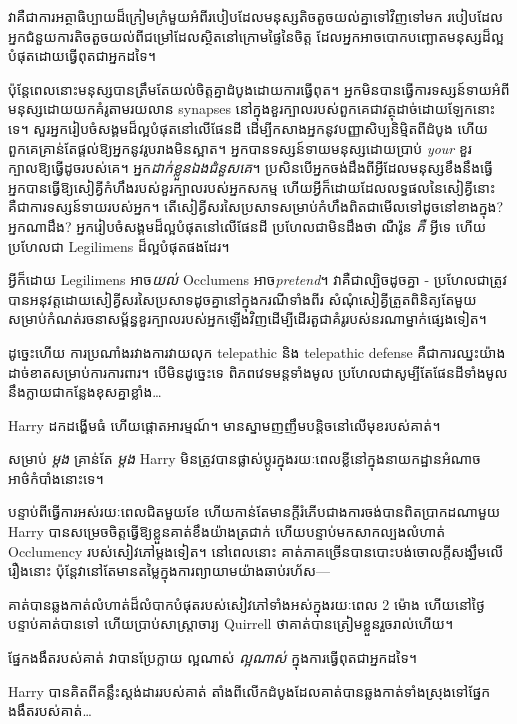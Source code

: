 {វាគឺជាការអត្ថាធិប្បាយដ៏ក្រៀមក្រំមួយអំពីរបៀបដែលមនុស្សតិចតួចយល់គ្នាទៅវិញទៅមក របៀបដែលអ្នកជំនួយការតិចតួចយល់ពីជម្រៅដែលស្ថិតនៅក្រោមផ្ទៃនៃចិត្ត ដែលអ្នកអាចបោកបញ្ឆោតមនុស្សដ៏ល្អបំផុតដោយធ្វើពុតជាអ្នកដទៃ។

ប៉ុន្តែ​ពេល​នោះ​មនុស្ស​បាន​ត្រឹម​តែ​យល់​ចិត្ត​គ្នា​ដំបូង​ដោយ​ការ​ធ្វើ​ពុត។ អ្នកមិនបានធ្វើការទស្សន៍ទាយអំពីមនុស្សដោយយកគំរូតាមរយលាន synapses នៅក្នុងខួរក្បាលរបស់ពួកគេជាវត្ថុដាច់ដោយឡែកនោះទេ។ សួរអ្នករៀបចំសង្គមដ៏ល្អបំផុតនៅលើផែនដី ដើម្បីកសាងអ្នកនូវបញ្ញាសិប្បនិម្មិតពីដំបូង ហើយពួកគេគ្រាន់តែផ្តល់ឱ្យអ្នកនូវរូបរាងមិនស្អាត។ អ្នកបានទស្សន៍ទាយមនុស្សដោយប្រាប់ \emph{your} ខួរក្បាលឱ្យធ្វើដូចរបស់គេ។ អ្នក\emph{ដាក់ខ្លួនឯងជំនួសគេ}។ ប្រសិនបើអ្នកចង់ដឹងពីអ្វីដែលមនុស្សខឹងនឹងធ្វើ អ្នកបានធ្វើឱ្យសៀគ្វីកំហឹងរបស់ខួរក្បាលរបស់អ្នកសកម្ម ហើយអ្វីក៏ដោយដែលលទ្ធផលនៃសៀគ្វីនោះគឺជាការទស្សន៍ទាយរបស់អ្នក។ តើសៀគ្វីសរសៃប្រសាទសម្រាប់កំហឹងពិតជាមើលទៅដូចនៅខាងក្នុង? អ្នកណាដឹង? អ្នករៀបចំសង្គមដ៏ល្អបំផុតនៅលើផែនដី ប្រហែលជាមិនដឹងថា ណឺរ៉ូន \emph{គឺ} អ្វីទេ ហើយប្រហែលជា Legilimens ដ៏ល្អបំផុតផងដែរ។

អ្វីក៏ដោយ Legilimens អាច\emph{យល់} Occlumens អាច\emph{pretend}។ វាគឺជាល្បិចដូចគ្នា - ប្រហែលជាត្រូវបានអនុវត្តដោយសៀគ្វីសរសៃប្រសាទដូចគ្នានៅក្នុងករណីទាំងពីរ សំណុំសៀគ្វីត្រួតពិនិត្យតែមួយសម្រាប់កំណត់រចនាសម្ព័ន្ធខួរក្បាលរបស់អ្នកឡើងវិញដើម្បីដើរតួជាគំរូរបស់នរណាម្នាក់ផ្សេងទៀត។

ដូច្នេះហើយ ការប្រណាំងរវាងការវាយលុក telepathic និង telepathic defense គឺជាការឈ្នះយ៉ាងដាច់ខាតសម្រាប់ការការពារ។ បើមិនដូច្នេះទេ ពិភពវេទមន្តទាំងមូល ប្រហែលជាសូម្បីតែផែនដីទាំងមូល នឹងក្លាយជាកន្លែងខុសគ្នាខ្លាំង…

Harry ដកដង្ហើមធំ ហើយផ្តោតអារម្មណ៍។ មានស្នាមញញឹមបន្តិចនៅលើមុខរបស់គាត់។

សម្រាប់ \emph{ម្តង} គ្រាន់តែ \emph{ម្តង} Harry មិនត្រូវបានផ្លាស់ប្តូរក្នុងរយៈពេលខ្លីនៅក្នុងនាយកដ្ឋានអំណាចអាថ៌កំបាំងនោះទេ។

បន្ទាប់ពីធ្វើការអស់រយៈពេលជិតមួយខែ ហើយកាន់តែមានក្តីរំភើបជាងការចង់បានពិតប្រាកដណាមួយ Harry បានសម្រេចចិត្តធ្វើឱ្យខ្លួនគាត់ខឹងយ៉ាងត្រជាក់ ហើយបន្ទាប់មកសាកល្បងលំហាត់ Occlumency របស់សៀវភៅម្តងទៀត។ នៅ​ពេល​នោះ គាត់​ភាគ​ច្រើន​បាន​បោះបង់​ចោល​ក្ដី​សង្ឃឹម​លើ​រឿង​នោះ ប៉ុន្តែ​វា​នៅ​តែ​មាន​តម្លៃ​ក្នុង​ការ​ព្យាយាម​យ៉ាង​ឆាប់​រហ័ស—

គាត់បានឆ្លងកាត់លំហាត់ដ៏លំបាកបំផុតរបស់សៀវភៅទាំងអស់ក្នុងរយៈពេល 2 ម៉ោង ហើយនៅថ្ងៃបន្ទាប់គាត់បានទៅ ហើយប្រាប់សាស្រ្តាចារ្យ Quirrell ថាគាត់បានត្រៀមខ្លួនរួចរាល់ហើយ។

ផ្នែកងងឹតរបស់គាត់ វាបានប្រែក្លាយ ល្អណាស់ \emph{ល្អណាស់} ក្នុងការធ្វើពុតជាអ្នកដទៃ។

Harry បានគិតពីគន្លឹះស្តង់ដាររបស់គាត់ តាំងពីលើកដំបូងដែលគាត់បានឆ្លងកាត់ទាំងស្រុងទៅផ្នែកងងឹតរបស់គាត់…

}
